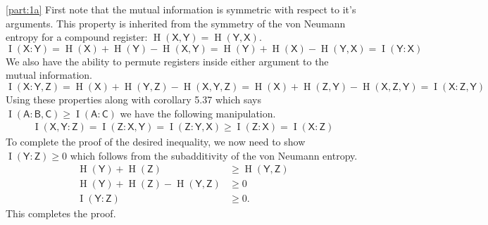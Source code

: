 \documentclass[boxes,pages,color=SeaGreen]{homework}
\newcommand{\reg}[1]{\mathsf{#1}}
\newcommand{\ent}{\operatorname{H}}
\newcommand{\mutIn}[2]{\operatorname{I} (#1: #2)}
\begin{document}
\begin{solution}
    \ref{part:1a}
    First note that the mutual information is symmetric with respect to it's arguments.
    This property is inherited from the symmetry of the von Neumann entropy for a compound register: $\ent(\reg{X}, \reg{Y}) = \ent(\reg{Y}, \reg{X})$.
    \begin{equation*}
        \mutIn{\reg{X}}{\reg{Y}} = \ent(\reg{X}) + \ent(\reg{Y}) - \ent(\reg{X}, \reg{Y}) =  \ent(\reg{Y}) + \ent(\reg{X}) - \ent(\reg{Y}, \reg{X}) = \mutIn{\reg{Y}}{\reg{X}}
    \end{equation*}
    We also have the ability to permute registers inside either argument to the mutual information.
    \begin{equation*}
        \mutIn{\reg{X}}{\reg{Y}, \reg{Z}} = \ent(\reg{X}) + \ent(\reg{Y}, \reg{Z}) - \ent(\reg{X}, \reg{Y}, \reg{Z}) = \ent(\reg{X}) + \ent(\reg{Z}, \reg{Y}) - \ent(\reg{X}, \reg{Z}, \reg{Y}) = \mutIn{\reg{X}}{\reg{Z}, \reg{Y}}
    \end{equation*}
    Using these properties along with corollary 5.37 which says $\mutIn{\reg{A}}{\reg{B},\reg{C}} \geq \mutIn{\reg{A}}{\reg{C}}$ we have the following manipulation.
    \begin{align*}
        \mutIn{\reg{X}, \reg{Y}}{\reg{Z}} = \mutIn{\reg{Z}}{\reg{X}, \reg{Y}} = \mutIn{\reg{Z}}{\reg{Y}, \reg{X}} \geq \mutIn{\reg{Z}}{\reg{X}} = \mutIn{\reg{X}}{\reg{Z}}
    \end{align*}
    To complete the proof of the desired inequality, we now need to show $\mutIn{\reg{Y}}{\reg{Z}} \geq 0$ which follows from the subadditivity of the von Neumann entropy.
    \begin{align*}
        \ent(\reg{Y}) + \ent(\reg{Z})                          & \geq \ent(\reg{Y}, \reg{Z}) \\
        \ent(\reg{Y}) + \ent(\reg{Z}) - \ent(\reg{Y}, \reg{Z}) & \geq 0                      \\
        \mutIn{\reg{Y}}{\reg{Z}}                               & \geq 0.
    \end{align*}
    This completes the proof.


\end{solution}
\end{document}
